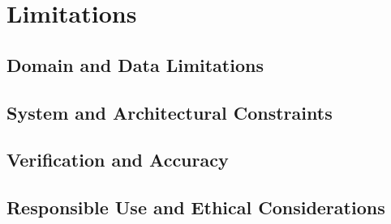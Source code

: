 
\section{Limitations}
\label{sec:limitations}


\subsection{Domain and Data Limitations}
\label{subsec:domain_limitations}


\subsection{System and Architectural Constraints}
\label{subsec:arch_limitations}


\subsection{Verification and Accuracy}
\label{subsec:accuracy_limitations}


\subsection{Responsible Use and Ethical Considerations}
\label{subsec:responsible_use}


